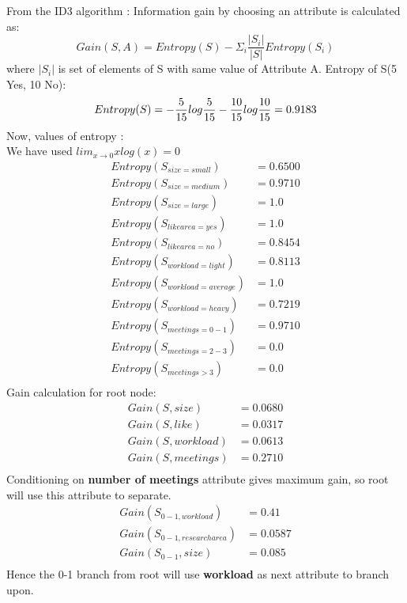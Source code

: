 \documentclass[a4paper,11pt]{article}
\begin{document}
\begin{mlsolution}
From the ID3 algorithm :
Information gain by choosing an attribute is calculated as:
\begin{equation}
		Gain(S,A) = Entropy(S) - \Sigma_i\frac{|S_i|}{|S|}Entropy(S_i)
\end{equation}	
		where $|S_i|$ is set of elements of S with same value of Attribute A.
Entropy of S(5 Yes, 10 No):
\begin{equation}
Entropy(S) = -\frac{5}{15}log\frac{5}{15} - \frac{10}{15}log\frac{10}{15} \\
	= 0.9183
\end{equation}
Now, values of entropy : \\
We have used $lim_{x \rightarrow 0} xlog(x) = 0$
\begin{align*}
  Entropy(S_{size=small}) &= 0.6500 \\
  Entropy(S_{size=medium}) &= 0.9710 \\
  Entropy(S_{size=large}) &= 1.0 \\
  Entropy(S_{likearea=yes}) &= 1.0 \\
  Entropy(S_{likearea=no}) &= 0.8454 \\
  Entropy(S_{workload=light}) &= 0.8113 \\
  Entropy(S_{workload=average}) &= 1.0 \\
  Entropy(S_{workload=heavy}) &= 0.7219 \\
  Entropy(S_{meetings=0-1}) &= 0.9710 \\
  Entropy(S_{meetings=2-3}) &= 0.0 \\
  Entropy(S_{meetings>3}) &= 0.0 \\  
\end{align*}
Gain calculation for root node:
\begin{align*}
  Gain(S,size) &= 0.0680 \\
  Gain(S,like) &= 0.0317 \\
  Gain(S,workload) &= 0.0613 \\
  Gain(S,meetings) &= 0.2710 \\
\end{align*}
Conditioning on \textbf{number of meetings} attribute gives maximum gain, so root will use this attribute to separate.
\begin{align*}
  Gain(S_{0-1,workload}) &= 0.41 \\
  Gain(S_{0-1,research area}) &= 0.0587 \\
  Gain(S_{0-1},size) &= 0.085 \\
\end{align*}
Hence the 0-1 branch from root will use \textbf{workload} as next attribute to branch upon.
\begin{figure}[th]%
\centering


\end{figure}
\end{mlsolution}
\end{document}
